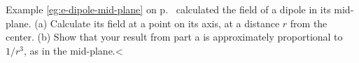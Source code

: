 Example \ref{eg:e-dipole-mid-plane} on p.~\pageref{eg:e-dipole-mid-plane} calculated the field
of a dipole in its mid-plane. (a) Calculate its field at a point on its axis, at a distance $r$
from the center. (b) Show that your result from part a is approximately proportional to
$1/r^3$, as in the mid-plane.<%
